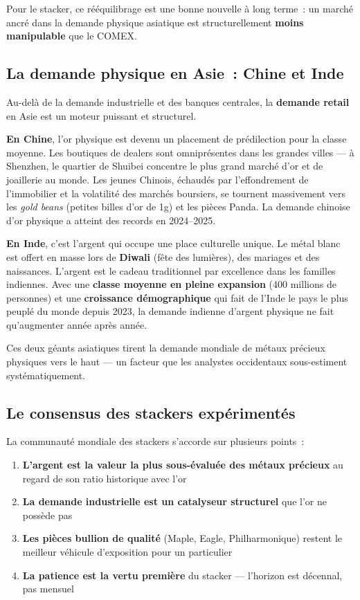 \documentclass[14pt,a4paper]{extarticle}
\begin{document}
Pour le stacker, ce rééquilibrage est une bonne nouvelle à long terme~: un marché ancré dans la demande physique asiatique est structurellement \textbf{moins manipulable} que le COMEX.

\subsection{La demande physique en Asie~: Chine et Inde}

Au-delà de la demande industrielle et des banques centrales, la \textbf{demande retail} en Asie est un moteur puissant et structurel.

\textbf{En Chine}, l'or physique est devenu un placement de prédilection pour la classe moyenne. Les boutiques de dealers sont omniprésentes dans les grandes villes --- à Shenzhen, le quartier de Shuibei concentre le plus grand marché d'or et de joaillerie au monde. Les jeunes Chinois, échaudés par l'effondrement de l'immobilier et la volatilité des marchés boursiers, se tournent massivement vers les \textit{gold beans} (petites billes d'or de 1g) et les pièces Panda. La demande chinoise d'or physique a atteint des records en 2024--2025.

\textbf{En Inde}, c'est l'argent qui occupe une place culturelle unique. Le métal blanc est offert en masse lors de \textbf{Diwali} (fête des lumières), des mariages et des naissances. L'argent est le cadeau traditionnel par excellence dans les familles indiennes. Avec une \textbf{classe moyenne en pleine expansion} (400 millions de personnes) et une \textbf{croissance démographique} qui fait de l'Inde le pays le plus peuplé du monde depuis 2023, la demande indienne d'argent physique ne fait qu'augmenter année après année.

Ces deux géants asiatiques tirent la demande mondiale de métaux précieux physiques vers le haut --- un facteur que les analystes occidentaux sous-estiment systématiquement.

\subsection{Le consensus des stackers expérimentés}

La communauté mondiale des stackers s'accorde sur plusieurs points~:

\begin{enumerate}
  \item \textbf{L'argent est la valeur la plus sous-évaluée des métaux précieux} au regard de son ratio historique avec l'or
  \item \textbf{La demande industrielle est un catalyseur structurel} que l'or ne possède pas
  \item \textbf{Les pièces bullion de qualité} (Maple, Eagle, Philharmonique) restent le meilleur véhicule d'exposition pour un particulier
  \item \textbf{La patience est la vertu première} du stacker --- l'horizon est décennal, pas mensuel
\end{enumerate}
\end{document}

